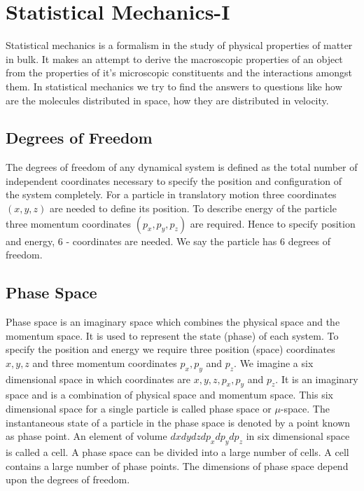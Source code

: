 \chapter{Statistical Mechanics-I}
Statistical mechanics is a formalism in the study of physical properties of matter in bulk. It makes an attempt to derive the macroscopic properties of an object from the properties of it's microscopic constituents and the interactions amongst them. In statistical mechanics we try to find the answers to questions like how are the molecules distributed in space, how they are distributed in velocity.
\section{Degrees of Freedom}
The degrees of freedom of any dynamical system is defined as the total number of independent coordinates necessary to specify the position and configuration of the system completely.
For a particle in translatory motion three coordinates $(x, y, z)$ are needed to define its position. To describe energy of the particle three momentum coordinates $\left(p_{x}, p_{y}, p_{z}\right)$ are required. Hence to specify position and energy, 6 - coordinates are needed. We say the particle has 6 degrees of freedom.
\section{Phase Space}
Phase space is an imaginary space which combines the physical space and the momentum space. It is used to represent the state (phase) of each system.
To specify the position and energy we require three position (space) coordinates ${x}, {y}, {z}$ and three momentum coordinates ${p}_{{x}}, {p}_{y}$ and ${p}_{z}$. We imagine a six dimensional space in which coordinates are $x, y, z, p_{x}, p_{y}$ and ${p}_{z}$. It is an imaginary space and is a combination of physical space and momentum space. This six dimensional space for a single particle is called phase space or $\mu$-space. The instantaneous state of a particle in the phase space is denoted by a point known as phase point. An element of volume $d x d y d z d p_{x} d p_{y} d p_{z}$ in six dimensional space is called a cell. A phase space can be divided into a large number of cells. A cell contains a large number of phase points. The dimensions of phase space depend upon the degrees of freedom.
